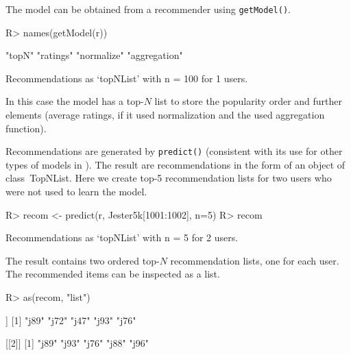 \documentclass[nojss]{jss}
\newcommand{\class}[1]{\mbox{\textsf{#1}}}
\newcommand{\func}[1]{\mbox{\texttt{#1()}}}
\begin{document}
The model can be obtained from a recommender using \func{getModel}.
\begin{Schunk}
\begin{Sinput}
R> names(getModel(r))
\end{Sinput}
\begin{Soutput}
[1] "topN"        "ratings"     "normalize"   "aggregation"
\end{Soutput}
\begin{Soutput}
Recommendations as ‘topNList’ with n = 100 for 1 users.
\end{Soutput}
\end{Schunk}

In this case the model has a
top-$N$ list to store the popularity order and further
elements (average ratings, if it used normalization and the
used aggregation function).

Recommendations are generated by \func{predict}
(consistent with its use for other types of models in
). The result
are recommendations in the form of an object of class~\class{TopNList}.
Here we create top-5 recommendation lists for two
users who were not used to learn the model.

\begin{Schunk}
\begin{Sinput}
R> recom <- predict(r, Jester5k[1001:1002], n=5)
R> recom
\end{Sinput}
\begin{Soutput}
Recommendations as ‘topNList’ with n = 5 for 2 users.
\end{Soutput}
\end{Schunk}

The result contains two ordered top-$N$ recommendation lists,
one for each user. The recommended items can be inspected as a list.
\begin{Schunk}
\begin{Sinput}
R> as(recom, "list")
\end{Sinput}
\begin{Soutput}
[[1]]
[1] "j89" "j72" "j47" "j93" "j76"

[[2]]
[1] "j89" "j93" "j76" "j88" "j96"
\end{Soutput}
\end{Schunk}
\end{document}
